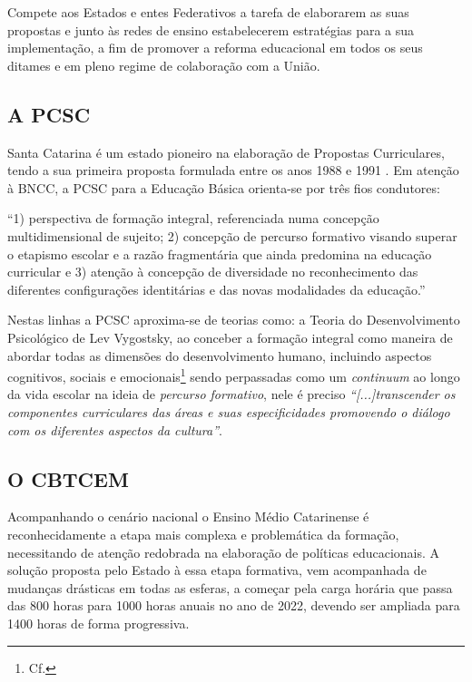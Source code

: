 Compete aos Estados e entes Federativos a tarefa de elaborarem as suas propostas e junto às redes de ensino estabelecerem estratégias para a sua implementação, a fim de promover a reforma educacional em todos os seus ditames e em pleno regime de colaboração com a União.

\subsection{A PCSC} %
\label{sub:A PCSC}
Santa Catarina é um estado pioneiro na elaboração de Propostas Curriculares, tendo a sua primeira proposta formulada entre os anos 1988 e 1991 \cite{CATARINA:1991}. Em atenção à \ac{BNCC}, a \ac{PCSC} para a Educação Básica orienta-se por três fios condutores: 

\begin{citacao}
	``1) perspectiva de formação integral, referenciada numa concepção multidimensional de sujeito; 2) concepção de percurso formativo visando superar o etapismo escolar e a razão fragmentária que ainda predomina na educação curricular e 3) atenção à concepção de diversidade no reconhecimento das diferentes configurações identitárias e das novas modalidades da educação.'' \cite[pp.~20]{PCSC:2014}
\end{citacao}
Nestas linhas a \ac{PCSC} aproxima-se de teorias como: a Teoria do Desenvolvimento Psicológico de Lev Vygostsky, ao conceber a formação integral como maneira de abordar todas as dimensões do desenvolvimento humano, incluindo aspectos cognitivos, sociais e emocionais\footnote{Cf. } sendo perpassadas como um \textit{continuum} ao longo da vida escolar na ideia de \textit{percurso formativo}, nele é preciso \textit{``[...]transcender os componentes curriculares das áreas e suas especificidades promovendo o diálogo com os diferentes aspectos da cultura''}.

\subsection{O CBTCEM} %
\label{sub:O CBTCEM}
Acompanhando o cenário nacional o Ensino Médio Catarinense é reconhecidamente a etapa mais complexa e problemática da formação, necessitando de atenção redobrada na elaboração de políticas educacionais. A solução proposta pelo Estado à essa etapa formativa, vem acompanhada de mudanças drásticas em todas as esferas, a começar pela carga horária que passa das 800 horas para 1000 horas anuais no ano de 2022, devendo ser ampliada para 1400 horas de forma progressiva.

